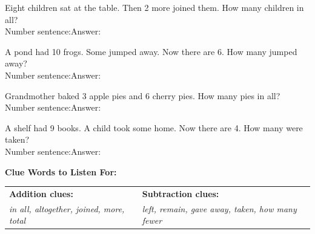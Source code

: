 \documentclass[12pt, letterpaper]{article}
\begin{document}
\medskip
\prob Eight children sat at the table. Then 2 more joined them. How many children in all?\\[6pt]
\hspace{2em}Number sentence:\ansblanklg \quad Answer:\ansblank

\medskip
\prob A pond had 10 frogs. Some jumped away. Now there are 6. How many jumped away?\\[6pt]
\hspace{2em}Number sentence:\ansblanklg \quad Answer:\ansblank

\medskip
\prob Grandmother baked 3 apple pies and 6 cherry pies. How many pies in all?\\[6pt]
\hspace{2em}Number sentence:\ansblanklg \quad Answer:\ansblank

\medskip
\prob A shelf had 9 books. A child took some home. Now there are 4. How many were taken?\\[6pt]
\hspace{2em}Number sentence:\ansblanklg \quad Answer:\ansblank

\bigskip
\begin{checkbox}
\textbf{\color{sd-green}Clue Words to Listen For:}\\[4pt]
\begin{tabular}{@{}p{6cm}p{6cm}@{}}
\textbf{Addition clues:} & \textbf{Subtraction clues:}\\
\textit{in all, altogether, joined, more, total} & \textit{left, remain, gave away, taken, how many fewer}
\end{tabular}
\end{checkbox}
\end{document}
